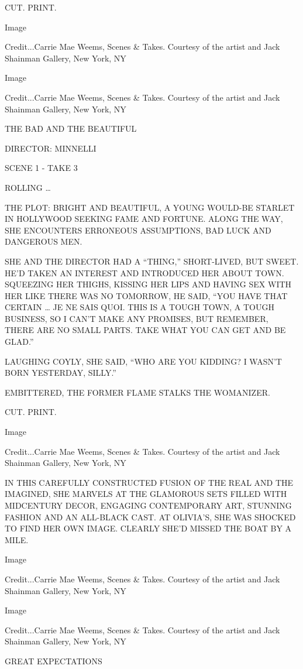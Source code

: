 CUT. PRINT.

Image

Credit...Carrie Mae Weems, Scenes \& Takes. Courtesy of the artist and
Jack Shainman Gallery, New York, NY

Image

Credit...Carrie Mae Weems, Scenes \& Takes. Courtesy of the artist and
Jack Shainman Gallery, New York, NY

THE BAD AND THE BEAUTIFUL

DIRECTOR: MINNELLI

SCENE 1 - TAKE 3

ROLLING \ldots{}

THE PLOT: BRIGHT AND BEAUTIFUL, A YOUNG WOULD-BE STARLET IN HOLLYWOOD
SEEKING FAME AND FORTUNE. ALONG THE WAY, SHE ENCOUNTERS ERRONEOUS
ASSUMPTIONS, BAD LUCK AND DANGEROUS MEN.

SHE AND THE DIRECTOR HAD A ``THING,'' SHORT-LIVED, BUT SWEET. HE'D TAKEN
AN INTEREST AND INTRODUCED HER ABOUT TOWN. SQUEEZING HER THIGHS, KISSING
HER LIPS AND HAVING SEX WITH HER LIKE THERE WAS NO TOMORROW, HE SAID,
``YOU HAVE THAT CERTAIN \ldots{} JE NE SAIS QUOI. THIS IS A TOUGH TOWN,
A TOUGH BUSINESS, SO I CAN'T MAKE ANY PROMISES, BUT REMEMBER, THERE ARE
NO SMALL PARTS. TAKE WHAT YOU CAN GET AND BE GLAD.''

LAUGHING COYLY, SHE SAID, ``WHO ARE YOU KIDDING? I WASN'T BORN
YESTERDAY, SILLY.''

EMBITTERED, THE FORMER FLAME STALKS THE WOMANIZER.

CUT. PRINT.

Image

Credit...Carrie Mae Weems, Scenes \& Takes. Courtesy of the artist and
Jack Shainman Gallery, New York, NY

IN THIS CAREFULLY CONSTRUCTED FUSION OF THE REAL AND THE IMAGINED, SHE
MARVELS AT THE GLAMOROUS SETS FILLED WITH MIDCENTURY DECOR, ENGAGING
CONTEMPORARY ART, STUNNING FASHION AND AN ALL-BLACK CAST. AT OLIVIA'S,
SHE WAS SHOCKED TO FIND HER OWN IMAGE. CLEARLY SHE'D MISSED THE BOAT BY
A MILE.

Image

Credit...Carrie Mae Weems, Scenes \& Takes. Courtesy of the artist and
Jack Shainman Gallery, New York, NY

Image

Credit...Carrie Mae Weems, Scenes \& Takes. Courtesy of the artist and
Jack Shainman Gallery, New York, NY

GREAT EXPECTATIONS

